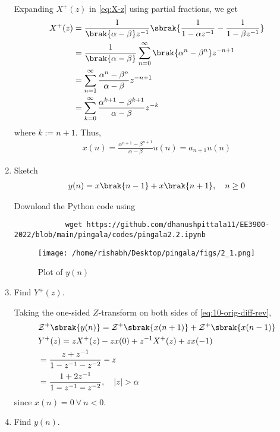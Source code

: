 \documentclass[journal,12pt,twocolumn]{IEEEtran}
\renewcommand\thesection{\arabic{section}}
\begin{document}
\begin{enumerate}[label=\thesection.\arabic*,ref=\thesection.\theenumi]
		\solution Expanding $X^+(z)$ in \eqref{eq:X-z} using partial fractions, we get
		\begin{align}
			X^+(z) &= \frac{1}{\brak{\alpha - \beta}z^{-1}}\sbrak{\frac{1}{1 - \alpha z^{-1}} - \frac{1}{1 - \beta z^{-1}}} \\
			&= \frac{1}{\brak{\alpha - \beta}}\sum_{n = 0}^{\infty}\brak{\alpha^n - \beta^n}z^{-n + 1} \\
			&= \sum_{n = 1}^{\infty}\frac{\alpha^{n} - \beta^{n}}{\alpha - \beta}z^{-n + 1} \\
			&= \sum_{k = 0}^{\infty}\frac{\alpha^{k + 1} - \beta^{k + 1}}{\alpha - \beta}z^{-k}
		\end{align}
		where $k := n + 1$. Thus,
		\begin{align}
			x(n) = \frac{\alpha^{n + 1} - \beta^{n + 1}}{\alpha - \beta}u(n) = a_{n + 1}u(n)
			\label{eq:x-n-def}
		\end{align}
		\item Sketch 
		\begin{align}
			y(n) = x\brak{n-1} + x\brak{n+1},  \quad n \ge 0
			\label{eq:10-orig-diff-rev}
		\end{align}
		
		\solution
		Download the Python code using
		\begin{lstlisting}
			wget https://github.com/dhanushpittala11/EE3900-2022/blob/main/pingala/codes/pingala2.2.ipynb
		\end{lstlisting}
		\begin{figure}[!htbp]
			\texttt{[image: /home/rishabh/Desktop/pingala/figs/2\_1.png]}
			\caption{Plot of $y(n)$}
			\label{fig:yn}
		\end{figure}
		\item Find $Y^{+}(z)$. 
		
		\solution Taking the one-sided $Z$-transform on both sides of \eqref{eq:10-orig-diff-rev},
		\begin{align}
			&\mathcal{Z}^+\sbrak{y(n)} = \mathcal{Z}^+\sbrak{x(n + 1)} + \mathcal{Z}^+\sbrak{x(n - 1)} \\
			&Y^+(z) = zX^+(z) - zx(0) + z^{-1}X^+(z) + zx(-1) \\
			&= \frac{z + z^{-1}}{1 - z^{-1} - z^{-2}} - z \\
			&= \frac{1 + 2z^{-1}}{1 - z^{-1} - z^{-2}}, \quad |z| > \alpha
		\end{align}
		since $x(n) = 0\ \forall\ n < 0$.
		\item Find $y(n)$.
		\label{pr:1-3}
		

\end{enumerate}
\end{document}
